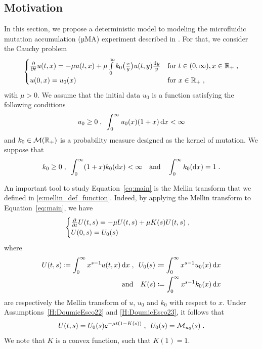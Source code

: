 \documentclass[11pt]{amsart}
\newcommand{\diff}{\,\mathrm{d}}
\begin{document}
    \subsection{Motivation}\mbox{}
    In this section, we propose a deterministic model to modeling the microfluidic mutation accumulation (µMA) experiment described in \cite{robert2018mutation}. For that, we consider the Cauchy problem
    \begin{equation}
        \begin{cases}
        \frac{\partial}{\partial t}u(t,x) = - \mu u(t,x) + \mu \int\limits_{0}^{\infty} k_0\big( \frac{x}{y}\big)u(t,y) \frac{\mathrm dy}{y}
        & \text{for } t \in (0, \infty), x \in \mathbb{R}_+ \; ,
        \\
        u(0, x) = u_0(x)
        & \text{for } x \in \mathbb{R}_+
        \; ,
        \end{cases}
        \label{eq:main}
    \end{equation}
    with $\mu > 0$. We assume that the initial data $u_0$ is a function satisfying the following conditions 
    \begin{align}
        \label{H:u0_L1}
        u_0 \geq 0 \eqsepv \int_0^\infty u_0(x)(1+x)\diff x < \infty
    \end{align}
    and $k_0 \in \mathcal{M}(\mathbb{R}_+)$ is a probability measure designed as the kernel of mutation. We suppose that 
    \begin{align}
        \label{H:k_0}
        k_0 \geq 0 \; , \enspace \int_0^\infty (1+x)k_0(\text{d}x) < \infty \quad \text{and} \quad \int_0^\infty k_0(\text{d}x) = 1 \; .
    \end{align}

    An important tool to study Equation~\eqref{eq:main} is the Mellin transform that we defined in \eqref{e:mellin_def_function}. Indeed, by applying the Mellin transform to Equation~\eqref{eq:main}, we have
	\begin{equation*}
        \begin{cases}
		\frac{\partial}{\partial t} U(t,s) = - \mu U(t,s) + \mu K(s) U(t,s)
		\; , \\
        U(0,s) = U_0(s)
    \end{cases}
	\end{equation*}
    where
    \begin{equation*}
        \begin{split}
        U(t,s) \coloneqq \int_0^\infty x^{s-1} u(t,x) \diff x 
        \eqsepv U_0(s) \coloneqq \int_0^\infty x^{s-1} u_0(x) \diff x \\
        \mtext{and} K(s) \coloneqq \int_0^\infty x^{s-1} k_0(x) \diff x 
        \end{split}
    \end{equation*}
    are respectively the Mellin transform of $u$, $u_0$ and $k_0$ with respect to $x$.    
    Under Assumptions~\eqref{H:DoumicEsco22} and \eqref{H:DoumicEsco23}, it follows that
    \begin{equation*}
        U(t,s) = U_0(s) e^{-\mu t(1 - K(s) ) }
        \; , \enspace
        U_0(s) = \mathcal{M}_{u_0}(s)
        \; .
    \end{equation*}
    We note that $K$ is a convex function, such that $K(1) = 1$.
\end{document}
